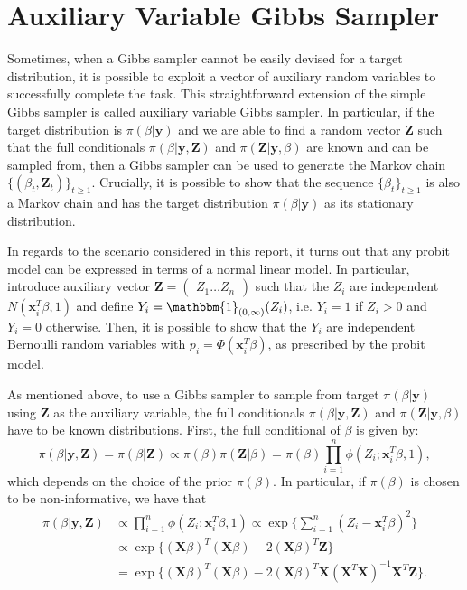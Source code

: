 \documentclass{article}
\newcommand{\IF}[2]{\mathbbm{1}_{#1}(#2)} %
\renewcommand{\vec}[1]{\mathbf{#1}}
\begin{document}
\section{Auxiliary Variable Gibbs Sampler}
Sometimes, when a Gibbs sampler cannot be easily devised for a target distribution, it is possible to exploit a vector of auxiliary random variables to successfully complete the task. This straightforward extension of the simple Gibbs sampler is called auxiliary variable Gibbs sampler. In particular, if the target distribution is \(\pi(\beta|\vec{y})\) and we are able to find a random vector \(\vec{Z}\) such that the full conditionals \(\pi(\beta|\vec{y}, \vec{Z})\) and \(\pi(\vec{Z}|\vec{y}, \beta)\) are known and can be sampled from, then a Gibbs sampler can be used to generate the Markov chain \(\{(\beta_t, \vec{Z}_t)\}_{t\geq 1}\). Crucially, it is possible to show that the sequence \(\{\beta_t\}_{t\geq 1}\) is also a Markov chain and has the target distribution \(\pi(\beta|\vec{y})\) as its stationary distribution. 
\par
In regards to the scenario considered in this report, it turns out that any probit model can be expressed in terms of a normal linear model. In particular, introduce auxiliary vector \(\vec{Z} = \begin{pmatrix} Z_1 \hdots Z_n \end{pmatrix}\) such that the \(Z_i\) are independent \(N(\vec{x}_i^T \beta, 1)\) and define \(Y_i = \IF{(0, \infty)}{Z_i}\), i.e. \(Y_i = 1\) if \(Z_i > 0\) and \(Y_i = 0\) otherwise. Then, it is possible to show that the \(Y_i\) are independent Bernoulli random variables with \(p_i = \Phi(\vec{x}_i^T\beta)\), as prescribed by the probit model. 
\par 
As mentioned above, to use a Gibbs sampler to sample from target \(\pi(\beta|\vec{y})\) using \(\vec{Z}\) as the auxiliary variable, the full conditionals \(\pi(\beta|\vec{y}, \vec{Z})\) and \(\pi(\vec{Z}|\vec{y}, \beta)\) have to be known distributions. First, the full conditional of \(\beta\) is given by:
\begin{equation*}
    \pi(\beta|\vec{y}, \vec{Z}) = \pi(\beta|\vec{Z}) \propto \pi(\beta) \pi(\vec{Z}|\beta) = \pi(\beta) \prod_{i=1}^n\phi(Z_i;\vec{x}_i^T \beta, 1),
\end{equation*}
which depends on the choice of the prior \(\pi(\beta)\). In particular, if \(\pi(\beta)\) is chosen to be non-informative, we have that
\begin{align*}
    \pi(\beta|\vec{y}, \vec{Z}) &\propto \prod_{i=1}^n\phi(Z_i;\vec{x}_i^T \beta, 1) \propto \exp\Bigg\{\sum_{i=1}^n (Z_i - \vec{x}_i^T \beta)^2\Bigg\} \\
                                &\propto \exp\Big\{(\vec{X} \beta)^T (\vec{X} \beta) - 2 (\vec{X}\beta)^T \vec{Z}\Big\} \\
                                &= \exp\Big\{(\vec{X} \beta)^T (\vec{X} \beta) - 2 (\vec{X}\beta)^T 
                                \vec{X} (\vec{X}^T \vec{X})^{-1}\vec{X}^T \vec{Z}\Big\}.
\end{align*}
\end{document}
